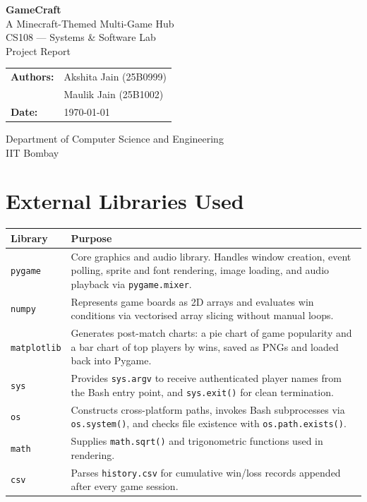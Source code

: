 \documentclass[12pt,a4paper]{article}
\begin{document}
\begin{titlepage}
    \centering
    \vspace*{2cm}
    {\Huge\textbf{GameCraft}}\\[0.4cm]
    {\large A Minecraft-Themed Multi-Game Hub}\\[2cm]
    {\Large CS108 --- Systems \& Software Lab}\\[0.3cm]
    {\large Project Report}\\[2cm]
    \begin{tabular}{ll}
        \textbf{Authors:} & Akshita Jain \quad (25B0999) \\[0.3cm]
                          & Maulik Jain \quad (25B1002) \\[1cm]
        \textbf{Date:}    & \today
    \end{tabular}
    \vfill
    Department of Computer Science and Engineering\\
    IIT Bombay
\end{titlepage}

\tableofcontents
\newpage

\section{External Libraries Used}

\begin{center}
\renewcommand{\arraystretch}{1.4}
\begin{tabular}{lp{10cm}}
\toprule
\textbf{Library} & \textbf{Purpose} \\
\midrule
\texttt{pygame}     & Core graphics and audio library. Handles window creation, event polling, sprite and font rendering, image loading, and audio playback via \texttt{pygame.mixer}. \\
\texttt{numpy}      & Represents game boards as 2D arrays and evaluates win conditions via vectorised array slicing without manual loops. \\
\texttt{matplotlib} & Generates post-match charts: a pie chart of game popularity and a bar chart of top players by wins, saved as PNGs and loaded back into Pygame. \\
\texttt{sys}        & Provides \texttt{sys.argv} to receive authenticated player names from the Bash entry point, and \texttt{sys.exit()} for clean termination. \\
\texttt{os}         & Constructs cross-platform paths, invokes Bash subprocesses via \texttt{os.system()}, and checks file existence with \texttt{os.path.exists()}. \\
\texttt{math}       & Supplies \texttt{math.sqrt()} and trigonometric functions used in rendering. \\
\texttt{csv}        & Parses \texttt{history.csv} for cumulative win/loss records appended after every game session. \\
\bottomrule
\end{tabular}
\end{center}
\end{document}
